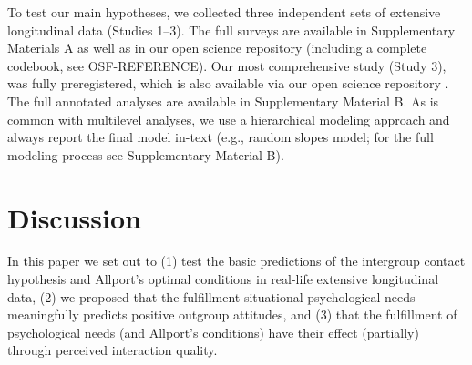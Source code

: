 \documentclass[man, 12pt, a4paper]{apa7}
\theoremstyle{break}
\theoremstyle{plain}
\begin{document}
To test our main hypotheses, we collected three independent sets of extensive longitudinal data (Studies 1–3). The full surveys are available in Supplementary Materials A as well as in our open science repository (including a complete codebook, see OSF-REFERENCE). Our most comprehensive study (Study 3), was fully preregistered, which is also available via our open science repository \citep[][]{Kreienkamp2021f}. The full annotated analyses are available in Supplementary Material B. As is common with multilevel analyses, we use a hierarchical modeling approach and always report the final model in-text (e.g., random slopes model; for the full modeling process see Supplementary Material B).



\section{Discussion}
In this paper we set out to (1) test the basic predictions of the intergroup contact hypothesis and Allport's optimal conditions in real-life extensive longitudinal data, (2) we proposed that the fulfillment situational psychological needs meaningfully predicts positive outgroup attitudes, and (3) that the fulfillment of psychological needs (and Allport's conditions) have their effect (partially) through perceived interaction quality. 
\end{document}
